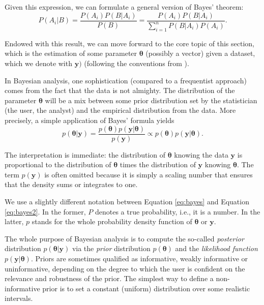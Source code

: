 \documentclass[]{krantz}
\theoremstyle{definition}
\theoremstyle{definition}
\theoremstyle{definition}
\theoremstyle{remark}
\begin{document}
Given this expression, we can formulate a general version of Bayes'
theorem: \begin{equation}
\label{eq:bayes}
P(A_i|B)=\frac{P(A_i)P(B|A_i)}{P(B)}= \frac{P(A_i)P(B|A_i)}{\sum_{i=1}^nP(B|A_i)P(A_i)}.
\end{equation}

Endowed with this result, we can move forward to the core topic of this
section, which is the estimation of some parameter
\(\boldsymbol{\theta}\) (possibly a vector) given a dataset, which we
denote with \(\textbf{y})\) (following the conventions from
\citet{gelman2013bayesian}).

In Bayesian analysis, one sophistication (compared to a frequentist
approach) comes from the fact that the data is not almighty. The
distribution of the parameter \(\boldsymbol{\theta}\) will be a mix
between some prior distribution set by the statistician (the user, the
analyst) and the empirical distribution from the data. More precisely, a
simple application of Bayes' formula yields \begin{equation}
\label{eq:bayes2}
p(\boldsymbol{\theta}| \textbf{y})=\frac{p(\boldsymbol{\theta})p(\textbf{y} |\boldsymbol{\theta})}{p(\textbf{y})} \propto p(\boldsymbol{\theta})p(\textbf{y} |\boldsymbol{\theta}).
\end{equation}

The interpretation is immediate: the distribution of
\(\boldsymbol{\theta}\) knowing the data \(\textbf{y}\) is proportional
to the distribution of \(\boldsymbol{\theta}\) times the distribution of
\(\textbf{y}\) knowing \(\boldsymbol{\theta}\). The term
\(p(\textbf{y})\) is often omitted because it is simply a scaling number
that ensures that the density sums or integrates to one.

We use a slightly different notation between Equation \eqref{eq:bayes} and
Equation \eqref{eq:bayes2}. In the former, \(P\) denotes a true
probability, i.e., it is a number. In the latter, \(p\) stands for the
whole probability density function of \(\boldsymbol{\theta}\) or
\(\textbf{y}\).

The whole purpose of Bayesian analysis is to compute the so-called
\emph{posterior} distribution \(p(\boldsymbol{\theta}| \textbf{y})\) via
the \emph{prior} distribution \(p(\boldsymbol{\theta})\) and the
\emph{likelihood function} \(p(\textbf{y} |\boldsymbol{\theta})\).
Priors are sometimes qualified as informative, weakly informative or
uninformative, depending on the degree to which the user is confident on
the relevance and robustness of the prior. The simplest way to define a
non-informative prior is to set a constant (uniform) distribution over
some realistic intervals.
\end{document}
